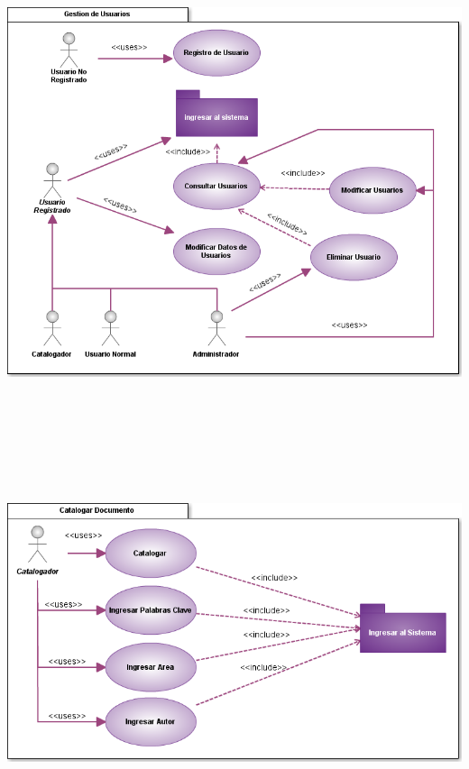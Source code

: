 \documentclass[]{article}
\begin{document}
        \begin{minipage}[c]{1\linewidth}
                \centering
                \includegraphics[scale=.6]{casosUso/CUGestionUsuarios}
        \end{minipage}     
        
        \begin{minipage}[c]{1\linewidth}
                \centering
                \includegraphics[width=16cm, height=14cm]{casosUso/CUCatalogar}
        \end{minipage}\\[5cm]
        
\end{document}
